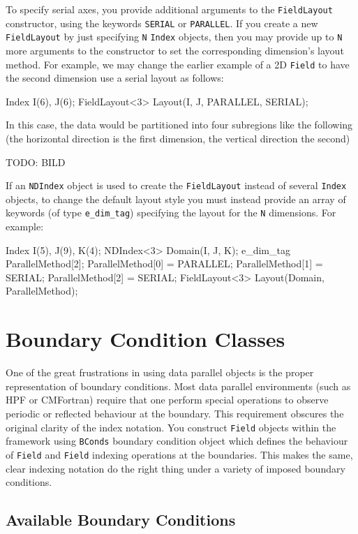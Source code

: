 To specify serial axes, you provide additional arguments to the \texttt{FieldLayout} constructor, using the keywords \texttt{SERIAL} or \texttt{PARALLEL}. If you create a new \texttt{FieldLayout} by just specifying \texttt{N} \texttt{Index} objects, then you may provide up to \texttt{N} more arguments to the constructor to set the corresponding dimension's layout method. For example, we may change the earlier example of a 2D \texttt{Field} to have the second dimension use a serial layout as follows:
\begin{smallcode}
Index I(6), J(6);
FieldLayout<3> Layout(I, J, PARALLEL, SERIAL);
\end{smallcode}
In this case, the data would be partitioned into four subregions like the following (the horizontal direction is the first dimension, the vertical direction the second)

TODO: BILD

If an \texttt{NDIndex} object is used to create the \texttt{FieldLayout} instead of several \texttt{Index} objects, to change the default layout style you must instead provide an array of keywords (of type \texttt{e\_dim\_tag}) specifying the layout for the \texttt{N} dimensions. For example: \\
\begin{code}
Index I(5), J(9), K(4);
NDIndex<3> Domain(I, J, K);
e_dim_tag ParallelMethod[2];
ParallelMethod[0] = PARALLEL;
ParallelMethod[1] = SERIAL;
ParallelMethod[2] = SERIAL;
FieldLayout<3> Layout(Domain, ParallelMethod);
\end{code}

\section{Boundary Condition Classes}

One of the great frustrations in using data parallel objects is the proper representation of boundary conditions. Most data parallel environments (such as HPF or CMFortran) require that one perform special operations to observe periodic or reflected behaviour at the boundary. This requirement obscures the original clarity of the index notation. You construct \texttt{Field} objects within the \ippl framework using \texttt{BConds} boundary condition object which defines the behaviour of \texttt{Field} and \texttt{Field}
indexing operations at the boundaries. This makes the same, clear indexing notation do the right thing under a variety of imposed boundary conditions.

\subsection{Available Boundary Conditions}

